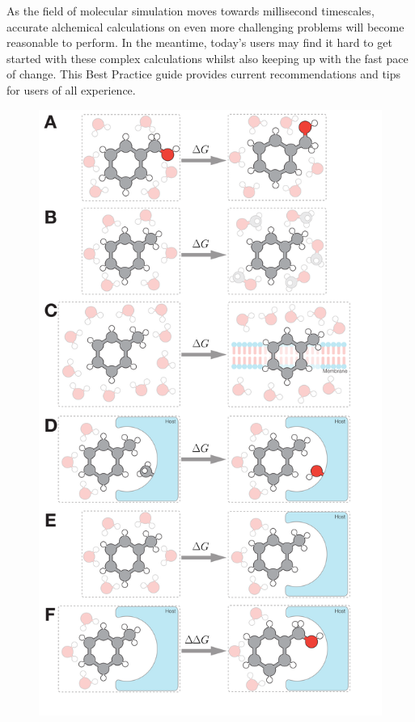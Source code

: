 \documentclass[9pt,bestpractices]{livecoms}
\begin{document}
As the field of molecular simulation moves towards millisecond timescales, accurate alchemical calculations on even more challenging problems will become reasonable to perform. In the meantime, today's users may find it hard to get started with these complex calculations whilst also keeping up with the fast pace of change. This Best Practice guide provides current recommendations and tips for users of all experience.  
%
\begin{figure}
    \includegraphics[width=0.95\linewidth]{figures/fig1_what_is_alchemy/Figure.pdf}   

\end{figure}
\end{document}
